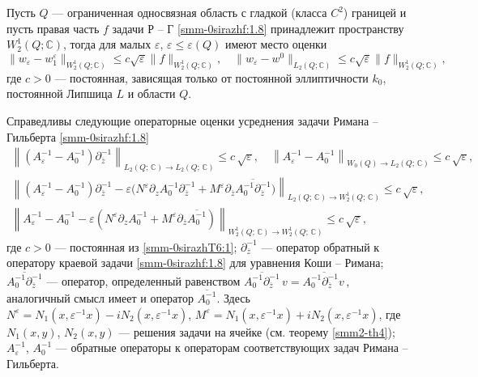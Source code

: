 \begin{theorem}
{ Пусть $Q$ --- ограниченная односвязная область с гладкой (класса $C^2$) границей и пусть правая часть $f$ задачи Р -- Г \eqref{smm-0sirazhf:1.8} принадлежит пространству $W_2^1(Q;\mathbb{C})$, тогда для малых $\varepsilon$, $\varepsilon\leqslant \varepsilon(Q)$ имеют место оценки
	\begin{equation}\label{smm-0sirazhT6:1}
		\|w_\varepsilon-w_1^\varepsilon\|_{W_2^1 (Q; \mathbb{C})}\leqslant c\sqrt{\varepsilon}\|f
		\|_{W^1_2 (Q; \mathbb{C})}, \quad \|w_\varepsilon-w^0\|_{L_2 (Q; \mathbb{C})}\leqslant c\sqrt{\varepsilon}\|f
		\|_{W_2^1 (Q; \mathbb{C})},
	\end{equation}
	где $c>0$ --- постоянная, зависящая только от постоянной эллиптичности $k_0$,  постоянной Липшица $L$ и области $Q$.}
\end{theorem}




\begin{theorem}
{ Справедливы следующие операторные оценки усреднения задачи Римана -- Гильберта \eqref{smm-0sirazhf:1.8}
	\begin{gather}\label{smm-0sirazhOpop1}
		\left\|\left(A_\varepsilon^{-1}-A_0^{-1}\right)\partial_{\overline z}^{-1}\right\|_{L_2(Q;\,\mathbb{C})\to L_2(Q;\,\mathbb{C})}
		\leq c\,\sqrt\varepsilon,\quad
		\left\|A_\varepsilon^{-1}-A_0^{-1}\right\|_{W_0(Q)\to L_2(Q;\,\mathbb{C})}
		\leq c\,\sqrt\varepsilon,\\
		\label{smm-0sirazhOpop2}
		\left\|\left(A_\varepsilon^{-1}-A_0^{-1}\right)\partial_{\overline z}^{-1}-\varepsilon\Big(N^\varepsilon
		\partial_zA_0^{-1}
		\partial_{\overline z}^{-1}\right.
		+\left.M^\varepsilon\partial_{\overline z}\overline{A_0^{-1}\partial_{\overline z}^{-1}}\Big)
		\right\|_{L_2(Q;\,\mathbb{C})\to W^1_2(Q;\,\mathbb{C})}
		\leq c\,\sqrt\varepsilon,\\
		\label{smm-0sirazhOpop3}
		\left\|A_\varepsilon^{-1}-A_0^{-1}-\varepsilon\left(N^\varepsilon\partial_zA_0^{-1}
		+M^\varepsilon\partial_{\overline z}\overline{A_0^{-1}}\right)
		\right\|_{W^1_2(Q;\,\mathbb{C})\to W^1_2(Q;\,\mathbb{C})}
		\leq c\,\sqrt\varepsilon,
	\end{gather}
	где $c>0$ --- постоянная из \eqref{smm-0sirazhT6:1}; $\partial_{\overline z}^{-1}$ --- оператор обратный к
	оператору краевой задачи
	\eqref{smm-0sirazhf:1.8} для уравнения Коши -- Римана;
	$\overline{A_0^{-1}\partial_{\overline z}^{-1}}$ --- оператор,
	определенный равенством $\overline{A_0^{-1}\partial_{\overline z}^{-1}}{\,v}=\overline{A_0^{-1}\partial_{\overline z}^{-1}{v\,}}$,
	аналогичный смысл имеет и оператор $\overline{A_0^{-1}}$. Здесь
	$N^\varepsilon=N_1(x,\varepsilon^{-1}x)-iN_2(x,\varepsilon^{-1}x)$, $M^\varepsilon=N_1(x,\varepsilon^{-1}x)+iN_2(x,\varepsilon^{-1}x)$,  где $N_1(x,y)$, $N_2(x,y)$ --- решения задачи
	на ячейке (см. теорему \ref{smm2-th4}); $A_\varepsilon^{-1}$, $A_0^{-1}$
	--- обратные операторы к операторам соответствующих  задач Римана -- Гильберта}.
\end{theorem}

